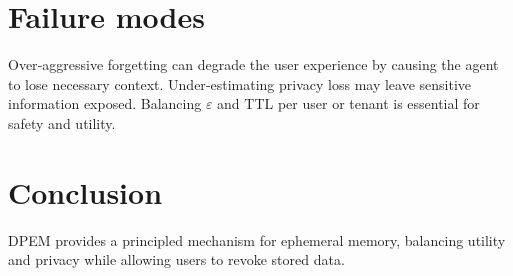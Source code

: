 \documentclass{article}
\begin{document}
\section{Failure modes}
Over‑aggressive forgetting can degrade the user experience by causing the agent to lose necessary context.  Under‑estimating privacy loss may leave sensitive information exposed.  Balancing $\varepsilon$ and TTL per user or tenant is essential for safety and utility.

\section{Conclusion}
DPEM provides a principled mechanism for ephemeral memory, balancing utility and privacy while allowing users to revoke stored data.
\end{document}

